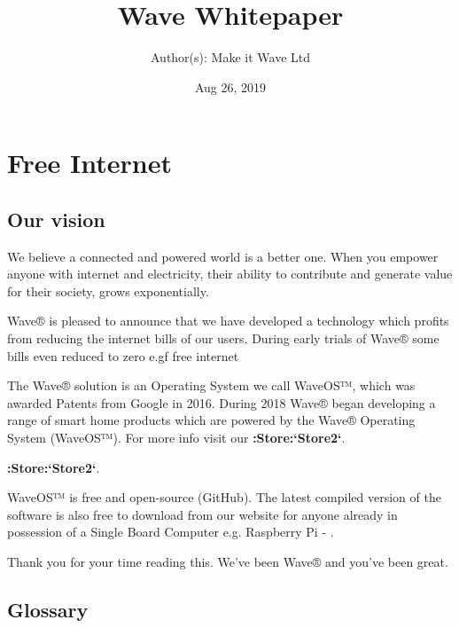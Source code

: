 \documentclass[letterpaper,10pt,openany,oneside,english]{sphinxmanual}
\title{Wave Whitepaper}
\date{Aug 26, 2019}
\author{Author(s): Make it Wave Ltd}
\begin{document}
\maketitle
\sphinxtableofcontents
{}\label{\detokenize{index::doc}}



\chapter{Free Internet}
\label{\detokenize{index:free-internet}}


\section{Our vision}
\label{\detokenize{index:our-vision}}
We believe a connected and powered world is a better one. When you empower anyone with internet and electricity, their ability to contribute and generate value for their society, grows exponentially.

Wave® is pleased to announce that we have developed a technology which profits from reducing the internet bills of our users. During early trials of Wave® some bills even reduced to zero e.gf free internet

The Wave® solution is an Operating System we call WaveOS™, which was awarded Patents from Google in 2016. During 2018 Wave® began developing a range of smart home products which are powered by the Wave® Operating System (WaveOS™). For more info visit our {\color{red}\bfseries{}:Store:{}`Store2{}`}.

{\color{red}\bfseries{}:Store:{}`Store2{}`}.

WaveOS™ is free and open-source (GitHub). The latest compiled version of the software is also free to download from our website for anyone already in possession of a Single Board Computer e.g. Raspberry Pi - .

Thank you for your time reading this.
We’ve been Wave® and you’ve been great.


\section{Glossary}
\label{\detokenize{index:glossary}}
\end{document}
